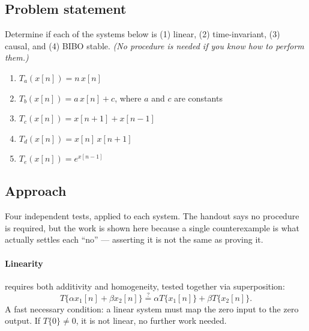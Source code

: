 





\subsection*{Problem statement}

Determine if each of the systems below is (1) linear, (2) time-invariant,
(3) causal, and (4) BIBO stable. \emph{(No procedure is needed if you know how
to perform them.)}
\begin{enumerate}
  \item $T_a(x[n]) = n\,x[n]$
  \item $T_b(x[n]) = a\,x[n] + c$, where $a$ and $c$ are constants
  \item $T_c(x[n]) = x[n+1] + x[n-1]$
  \item $T_d(x[n]) = x[n]\,x[n+1]$
  \item $T_e(x[n]) = e^{x[n-1]}$
\end{enumerate}

\subsection*{Approach}

Four independent tests, applied to each system. The handout says no procedure is
required, but the work is shown here because a single counterexample is what
actually settles each ``no'' — asserting it is not the same as proving it.

\paragraph{Linearity} requires both additivity and homogeneity, tested together
via superposition:
\begin{equation}
  T\{\alpha x_1[n] + \beta x_2[n]\} \overset{?}{=} \alpha T\{x_1[n]\} + \beta T\{x_2[n]\}.
  \label{eq:lin}
\end{equation}
A fast necessary condition: a linear system must map the zero input to the zero
output. If $T\{0\} \ne 0$, it is not linear, no further work needed.

